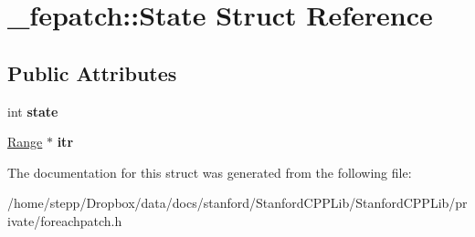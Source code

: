 \hypertarget{struct__fepatch_1_1State}{}\section{\+\_\+fepatch\+:\+:State Struct Reference}
\label{struct__fepatch_1_1State}
\subsection*{Public Attributes}
\begin{DoxyCompactItemize}
\item 
\mbox{\label{struct__fepatch_1_1State_a7c1ec7c894bd170bd0e3e09ef1250f62}} 
int {\bfseries state}
\item 
\mbox{\label{struct__fepatch_1_1State_a20aca7896b6433ce6ec18fd9213291b2}} 
\mbox{\hyperlink{struct__fepatch_1_1Range}{Range}} $\ast$ {\bfseries itr}
\end{DoxyCompactItemize}


The documentation for this struct was generated from the following file\+:\begin{DoxyCompactItemize}
\item 
/home/stepp/\+Dropbox/data/docs/stanford/\+Stanford\+C\+P\+P\+Lib/\+Stanford\+C\+P\+P\+Lib/private/foreachpatch.\+h\end{DoxyCompactItemize}
